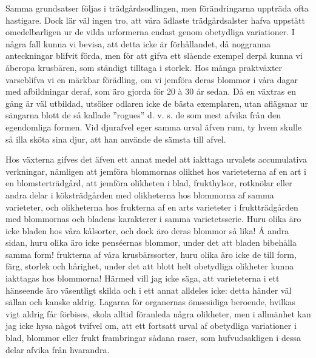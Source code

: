 Samma grundsatser följas i trädgårdsodlingen, men förändringarna uppträda ofta hastigare. Dock lär väl ingen tro, att våra ädlaste trädgårdsalster hafva uppstått omedelbarligen ur de vilda urformerna endast genom obetydliga variationer. I några fall kunna vi bevisa, att detta icke är förhållandet, då noggranna anteckningar blifvit förda, men för att gifva ett slående exempel derpå kunna vi åberopa krusbären, som ständigt tilltaga i storlek. Hos många praktväxter varseblifva vi en märkbar förädling, om vi jemföra deras blommor i våra dagar med afbildningar deraf, som äro gjorda för 20 à 30 år sedan. Då en växtras en gång är väl utbildad, utsöker odlaren icke de bästa exemplaren, utan aflägsnar ur sängarna blott de så kallade ”rogues” d. v. s. de som mest afvika från den egendomliga formen. Vid djurafvel eger samma urval äfven rum, ty hvem skulle så illa sköta sina djur, att han använde de sämsta till afvel.

Hos växterna gifves det äfven ett annat medel att iakttaga urvalets accumulativa verkningar, nämligen att jemföra blommornas olikhet hos varieteterna af en art i en blomsterträdgård, att jemföra olikheten i blad, frukthylsor, rotknölar eller andra delar i köksträdgården med olikheterna hos blommorna af samma varieteter, och olikheterna hos frukterna af en arts varieteter i fruktträdgården med blommornas och bladens karakterer i samma varietetsserie. Huru olika äro icke bladen hos våra kålsorter, och dock äro deras blommor så lika! Å andra sidan, huru olika äro icke penséernas blommor, under det att bladen bibehålla samma form! frukterna af våra krusbärssorter, huru olika äro icke de till form, färg, storlek och hårighet, under det att blott helt obetydliga olikheter kunna iakttagas hos blommorna! Härmed vill jag icke säga, att varieteterna i ett hänseende äro väsentligt skilda och i ett annat alldeles icke: detta händer väl sällan och kanske aldrig. Lagarna för organernas ömsesidiga beroende, hvilkas vigt aldrig får förbises, skola alltid föranleda några olikheter, men i allmänhet kan jag icke hysa något tvifvel om, att ett fortsatt urval af obetydliga variationer i blad, blommor eller frukt frambringar sådana raser, som hufvudsakligen i dessa delar afvika från hvarandra.

